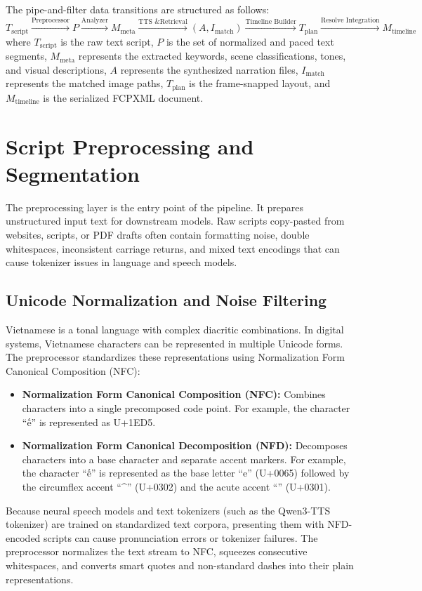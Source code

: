 \documentclass[a4paper,12pt]{report}
\begin{document}
The pipe-and-filter data transitions are structured as follows:
\begin{equation}
    T_{\text{script}} \xrightarrow{\text{Preprocessor}} P \xrightarrow{\text{Analyzer}} M_{\text{meta}} \xrightarrow{\text{TTS \& Retrieval}} (A, I_{\text{match}}) \xrightarrow{\text{Timeline Builder}} T_{\text{plan}} \xrightarrow{\text{Resolve Integration}} M_{\text{timeline}}
\end{equation}
where $T_{\text{script}}$ is the raw text script, $P$ is the set of normalized and paced text segments, $M_{\text{meta}}$ represents the extracted keywords, scene classifications, tones, and visual descriptions, $A$ represents the synthesized narration files, $I_{\text{match}}$ represents the matched image paths, $T_{\text{plan}}$ is the frame-snapped layout, and $M_{\text{timeline}}$ is the serialized FCPXML document.

\section{Script Preprocessing and Segmentation}
The preprocessing layer is the entry point of the pipeline. It prepares unstructured input text for downstream models. Raw scripts copy-pasted from websites, scripts, or PDF drafts often contain formatting noise, double whitespaces, inconsistent carriage returns, and mixed text encodings that can cause tokenizer issues in language and speech models.

\subsection{Unicode Normalization and Noise Filtering}
Vietnamese is a tonal language with complex diacritic combinations. In digital systems, Vietnamese characters can be represented in multiple Unicode forms. The preprocessor standardizes these representations using Normalization Form Canonical Composition (NFC):
\begin{itemize}
    \item \textbf{Normalization Form Canonical Composition (NFC):} Combines characters into a single precomposed code point. For example, the character ``ế'' is represented as U+1ED5.
    \item \textbf{Normalization Form Canonical Decomposition (NFD):} Decomposes characters into a base character and separate accent markers. For example, the character ``ế'' is represented as the base letter ``e'' (U+0065) followed by the circumflex accent ``\^{}'' (U+0302) and the acute accent ``\textasciiacute'' (U+0301).
\end{itemize}
Because neural speech models and text tokenizers (such as the Qwen3-TTS tokenizer) are trained on standardized text corpora, presenting them with NFD-encoded scripts can cause pronunciation errors or tokenizer failures. The preprocessor normalizes the text stream to NFC, squeezes consecutive whitespaces, and converts smart quotes and non-standard dashes into their plain representations.
\end{document}
